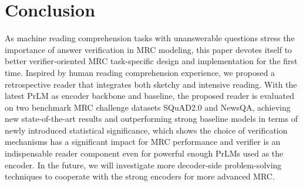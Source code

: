 \documentclass[letterpaper]{article} %
\begin{document}
\section{Conclusion}
As machine reading comprehension tasks with unanswerable questions stress the importance of answer verification in MRC modeling, this paper devotes itself to better verifier-oriented MRC task-specific design and implementation for the first time. Inspired by human reading comprehension experience, we proposed a retrospective reader that integrates both sketchy and intensive reading. With the latest PrLM as encoder backbone and baseline, the proposed reader is evaluated on two benchmark MRC challenge datasets SQuAD2.0 and NewsQA, achieving new state-of-the-art results and outperforming strong baseline models in terms of newly introduced statistical significance, which shows the choice of verification mechanisms has a significant impact for MRC performance and verifier is an indispensable reader component even for powerful enough PrLMs used as the encoder. In the future, we will investigate more decoder-side problem-solving techniques to cooperate with the strong encoders for more advanced MRC.


% 
\end{document}
